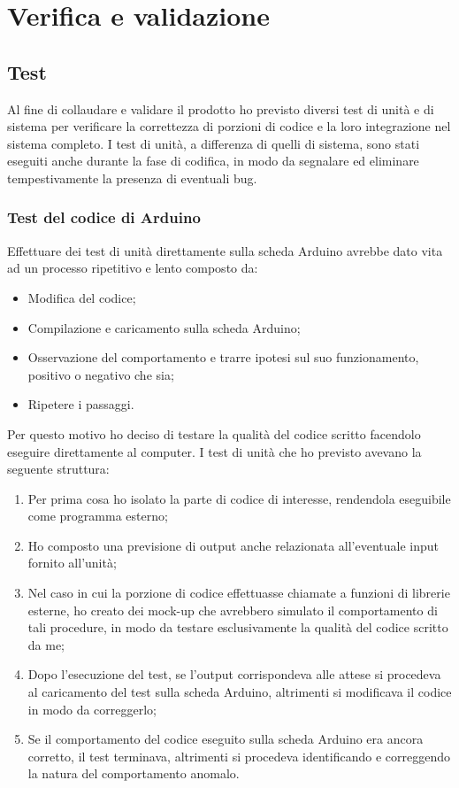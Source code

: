 \section{Verifica e validazione}
\subsection{Test}\label{test}
Al fine di collaudare e validare il prodotto ho previsto diversi test di unità e di sistema per verificare la correttezza di porzioni di codice e la loro integrazione nel sistema completo. I test di unità, a differenza di quelli di sistema, sono stati eseguiti anche durante la fase di codifica, in modo da segnalare ed eliminare tempestivamente la presenza di eventuali bug.
\subsubsection{Test del codice di Arduino}
Effettuare dei test di unità direttamente sulla scheda Arduino avrebbe dato vita ad un processo ripetitivo e lento composto da:
\begin{itemize}
\item Modifica del codice;
\item Compilazione e caricamento sulla scheda Arduino;
\item Osservazione del comportamento e trarre ipotesi sul suo funzionamento, positivo o negativo che sia;
\item Ripetere i passaggi.
\end{itemize}

Per questo motivo ho deciso di testare la qualità del codice scritto facendolo eseguire direttamente al computer. 
I test di unità che ho previsto avevano la seguente struttura:
\begin{enumerate}
\item Per prima cosa ho isolato la parte di codice di interesse, rendendola eseguibile come programma esterno;
\item Ho composto una previsione di output anche relazionata all'eventuale input fornito all'unità;
\item Nel caso in cui la porzione di codice effettuasse chiamate a funzioni di librerie esterne, ho creato dei mock-up che avrebbero simulato il comportamento di tali procedure, in modo da testare esclusivamente la qualità del codice scritto da me;
\item Dopo l'esecuzione del test, se l'output corrispondeva alle attese si procedeva al caricamento del test sulla scheda Arduino, altrimenti si modificava il codice in modo da correggerlo;
\item Se il comportamento del codice eseguito sulla scheda Arduino era ancora corretto, il test terminava, altrimenti si procedeva identificando e correggendo la natura del comportamento anomalo.
\end{enumerate}


